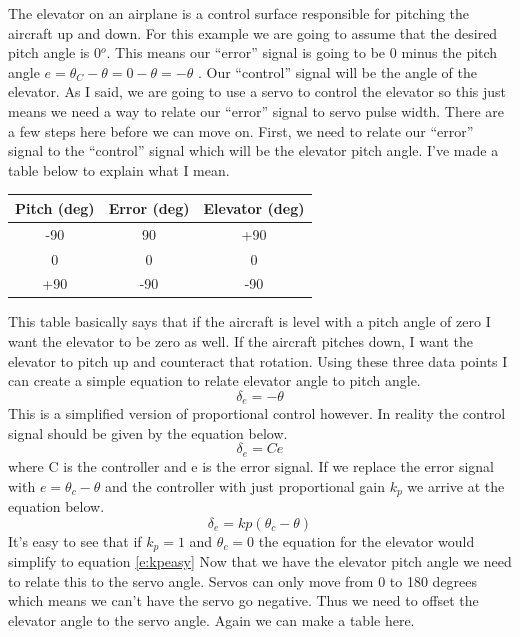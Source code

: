 The elevator on an airplane is a control surface responsible for
pitching the aircraft up and down. For this example we are going to
assume that the desired pitch angle is 0$^o$. This means our “error”
signal is going to be 0 minus the pitch angle $e = \theta_C - \theta = 0 - \theta = -\theta$ . Our “control” signal
will be the angle of the elevator. As I said, we are going to use a
servo to control the elevator so this just means we need a way to
relate our “error” signal to servo pulse width. There are a few steps
here before we can move on. First, we need to relate our “error”
signal to the “control” signal which will be the elevator pitch
angle. I’ve made a table below to explain what I mean. 
\begin{table}[H]
\begin{center}
\begin{tabular}{|c|c|c|}
\hline
Pitch (deg) & Error (deg) & Elevator (deg) \\
\hline
-90 & 90 & +90 \\
\hline
0 & 0 & 0 \\
\hline
+90 & -90 & -90 \\
\hline
\end{tabular}
\end{center}
\end{table}
This table basically says that if the aircraft is level with a pitch angle of zero I want the elevator to be zero as well. If the aircraft pitches down, I want the elevator to pitch up and counteract that rotation. Using these three data points I can create a simple equation to relate elevator angle to pitch angle.
\begin{equation}\label{e:kpeasy}
\delta_e = -\theta
\end{equation}
This is a simplified version of proportional control however. In reality the control signal should be given by the equation below.
\begin{equation}
\delta_e = Ce
\end{equation}
where C is the controller and e is the error signal. If we replace the error signal with $e=\theta_c-\theta$ and the controller with just proportional gain $k_p$ we arrive at the equation below.
\begin{equation}
\delta_e = kp(\theta_c-\theta)
\end{equation}
It's easy to see that if $k_p=1$ and $\theta_c=0$ the equation for the elevator would simplify to equation \ref{e:kpeasy} Now that we have the elevator pitch angle we need to relate this to the servo angle. Servos can only move from 0 to 180 degrees which means we can’t have the servo go negative. Thus we need to offset the elevator angle to the servo angle. Again we can make a table here.
